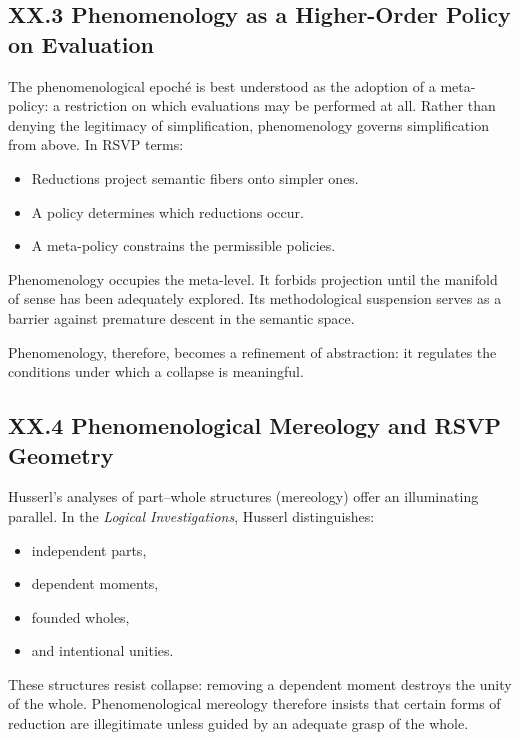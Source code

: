 \documentclass[12pt,letterpaper]{article}
\begin{document}
\subsection{XX.3 Phenomenology as a Higher-Order Policy on Evaluation}

The phenomenological epoché is best understood as the adoption of a meta-policy:
a restriction on which evaluations may be performed at all.  Rather than denying
the legitimacy of simplification, phenomenology governs simplification from
above.  In RSVP terms:
\begin{itemize}
    \item Reductions project semantic fibers onto simpler ones.
    \item A policy determines which reductions occur.
    \item A meta-policy constrains the permissible policies.
\end{itemize}

Phenomenology occupies the meta-level.  It forbids projection until the manifold
of sense has been adequately explored.  Its methodological suspension serves as
a barrier against premature descent in the semantic space.

Phenomenology, therefore, becomes a refinement of abstraction: it regulates the
conditions under which a collapse is meaningful.

\subsection{XX.4 Phenomenological Mereology and RSVP Geometry}

Husserl’s analyses of part–whole structures (mereology) offer an illuminating
parallel.  In the \emph{Logical Investigations}, Husserl distinguishes:
\begin{itemize}
    \item independent parts,  
    \item dependent moments,  
    \item founded wholes,  
    \item and intentional unities.
\end{itemize}
These structures resist collapse: removing a dependent moment destroys the unity
of the whole.  Phenomenological mereology therefore insists that certain forms
of reduction are illegitimate unless guided by an adequate grasp of the whole.
\end{document}

